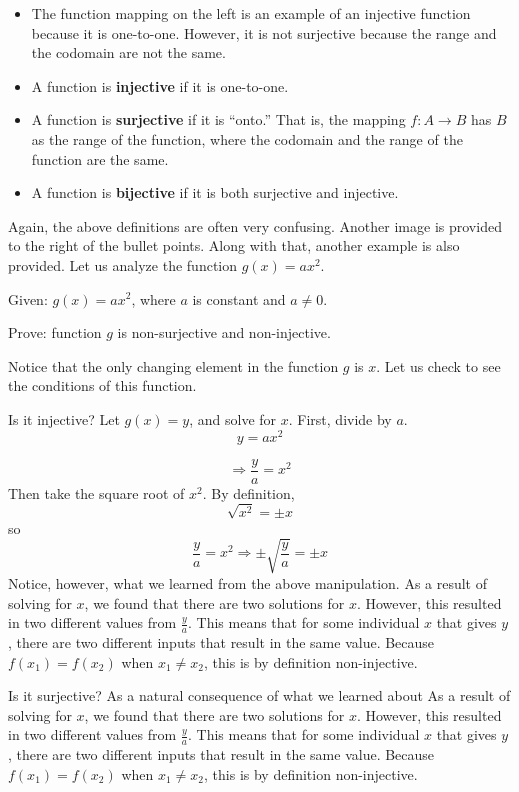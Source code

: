 \begin{itemize}
    \item The function mapping on the left is an example of an injective function because it is one-to-one. However, it is not surjective because the range and the codomain are not the same.
    \item A function is \textbf{injective} if it is one-to-one.
    \item A function is \textbf{surjective} if it is ``onto.'' That is, the mapping $f:A \to B$ has $B$ as the range of the function, where the codomain and the range of the function are the same.
    \item A function is \textbf{bijective} if it is both surjective and injective.
\end{itemize}

Again, the above definitions are often very confusing. Another image is provided to the right of the bullet points. Along with that, another example is also provided. Let us analyze the function $g(x) = ax^2$.

Given: $g(x) = ax^2$, where $a$ is constant and $a \neq 0$.

Prove: function $g$ is non-surjective and non-injective.

Notice that the only changing element in the function $g$ is $x$. Let us check to see the conditions of this function.

Is it injective? Let $g(x) = y$, and solve for $x$. First, divide by $a$.
\[
y = ax^2
\]

\[
\Rightarrow \frac{y}{a} = x^2
\]
Then take the square root of $x^2$. By definition, 
\[
\sqrt{x^2} = \pm x
\]
so
\[
\frac{y}{a} = x^2 \Rightarrow \pm \sqrt{\frac{y}{a}} = \pm x
\]
Notice, however, what we learned from the above manipulation. As a result of solving for $x$, we found that there are two solutions for $x$. However, this resulted in two different values from $\frac{y}{a}$. This means that for some individual $x$ that gives $y$, there are two different inputs that result in the same value. Because $f(x_1) = f(x_2)$ when $x_1 \neq x_2$, this is by definition non-injective.

Is it surjective? As a natural consequence of what we learned about As a result of solving for $x$, we found that there are two solutions for $x$. However, this resulted in two different values from $\frac{y}{a}$. This means that for some individual $x$ that gives $y$, there are two different inputs that result in the same value. Because $f(x_1) = f(x_2)$ when $x_1 \neq x_2$, this is by definition non-injective.

